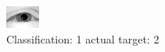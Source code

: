 \begin{figure}[h!]
\begin{center}
\includegraphics[width=0.60\columnwidth]{figures/ID2254_class_1_target_2.png}
\end{center}
\caption{ Classification: 1 actual target: 2}
\label{fig:ID2254_class_1_target_2}
\end{figure}

